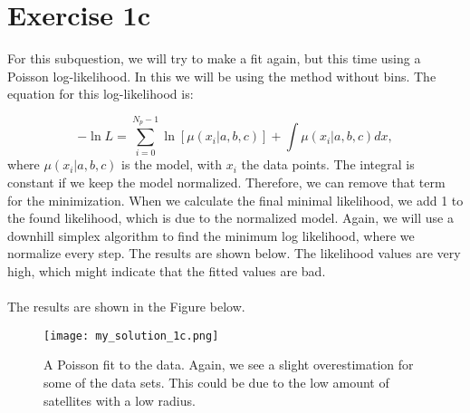 \section{Exercise 1c}

For this subquestion, we will try to make a fit again, but this time using a Poisson log-likelihood. In this we will be using the method without bins. The equation for this log-likelihood is: 

\begin{equation}
    -\ln{L} = \sum^{N_p-1}_{i = 0} \ln{[\mu(x_i|a,b,c)] + \int \mu(x_i|a,b,c) dx}, 
\end{equation}
where $\mu(x_i|a,b,c)$ is the model, with $x_i$ the data points. The integral is constant if we keep the model normalized. Therefore, we can remove that term for the minimization. When we calculate the final minimal likelihood, we add 1 to the found likelihood, which is due to the normalized model. Again, we will use a downhill simplex algorithm to find the minimum log likelihood, where we normalize every step. The results are shown below. The likelihood values are very high, which might indicate that the fitted values are bad. 
\\
\\



The results are shown in the Figure below.

\begin{figure}[h!]
  \centering
  \texttt{[image: my\_solution\_1c.png]}
  \caption{A Poisson fit to the data. Again, we see a slight overestimation for some of the data sets. This could be due to the low amount of satellites with a low radius.}
\end{figure}
